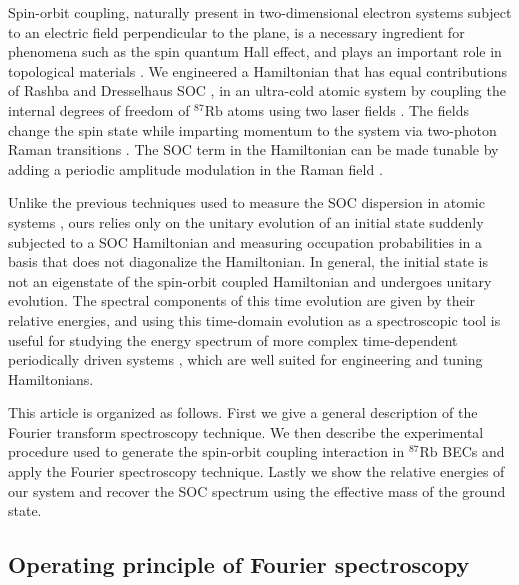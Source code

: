 Spin-orbit coupling, naturally present in two-dimensional electron systems subject to an electric field perpendicular to the plane, is a necessary ingredient for phenomena such as the spin quantum Hall effect, and plays an important role in topological materials \cite{bychkov_oscillatory_1984-1,hasan_textitcolloquium_2010}. We engineered a Hamiltonian that has equal contributions of Rashba and Dresselhaus SOC \cite{lin_spin-orbit-coupled_2011}, in an ultra-cold atomic system by coupling the internal degrees of freedom of $^{87}\mathrm{Rb}$ atoms using  two laser fields \cite{dalibard_textitcolloquium_2011}. The fields change the spin state while imparting momentum to the system via two-photon Raman transitions \cite{lan_raman-dressed_2014,campbell_magnetic_2016}. The SOC term in the Hamiltonian can be made tunable by adding a periodic amplitude modulation in the Raman field \cite{jimenez-garcia_tunable_2015}.

Unlike the previous techniques used to measure the SOC dispersion in atomic systems \cite{cheuk_spin-injection_2012}, ours relies only on the unitary evolution of an initial state suddenly subjected to a SOC Hamiltonian and measuring occupation probabilities in a basis that does not diagonalize the Hamiltonian. In general, the initial state is not an eigenstate of the spin-orbit coupled Hamiltonian and undergoes unitary evolution. The spectral components of this time evolution are given by their relative energies, and using this time-domain evolution as a spectroscopic tool is useful for studying the energy spectrum of more complex time-dependent periodically driven systems \cite{jimenez-garcia_tunable_2015,eckardt_superfluid-insulator_2005,goldman_periodically_2014}, which are well suited for engineering and tuning Hamiltonians.

This article is organized as follows. First we give a general description of the Fourier transform spectroscopy technique. We then describe the experimental procedure used to generate the spin-orbit coupling interaction in $^{87}$Rb BECs and apply the Fourier spectroscopy technique. Lastly we show the relative energies of our system and recover the SOC spectrum using the effective mass of the ground state. 

\subsection*{Operating principle of Fourier spectroscopy}

